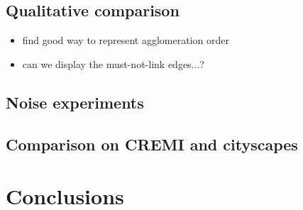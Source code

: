 \documentclass[10pt,twocolumn,letterpaper]{article}
\begin{document}



\subsection{Qualitative comparison}
\begin{itemize}
\item find good way to represent agglomeration order
\item can we display the must-not-link edges...?
\end{itemize}
\subsection{Noise experiments}

\subsection{Comparison on CREMI and cityscapes}

\section{Conclusions}
\end{document}
